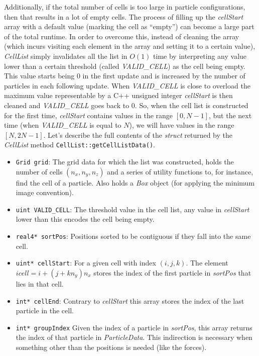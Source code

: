 \documentclass[twoside,openright,titlepage,numbers=noenddot,%
headinclude,footinclude,cleardoublepage=empty,abstract=on,
BCOR=5mm,fontsize=11pt, dvipsnames, paper=b5
]{scrreprt}
\def\ucpp{uammd_cpp_lexer.py:UAMMDCppLexer -x}
\begin{document}
Additionally, if the total number of cells is too large in particle configurations, then that results in a lot of empty cells. The process of filling up the \emph{cellStart} array with a default value (marking the cell as ``empty'') can become a large part of the total runtime. In order to overcome this, instead of cleaning the array (which incurs visiting each element in the array and setting it to a certain value), \emph{CellList} simply invalidates all the list in $O(1)$ time by interpreting any value lower than a certain threshold (called \emph{VALID\_CELL}) as the cell being empty.
This value starts being $0$ in the first update and is increased by the number of particles in each following update. When \emph{VALID\_CELL} is close to overload the maximum value representable by a C++ unsigned integer \emph{cellStart} is then cleaned and \emph{VALID\_CELL} goes back to $0$. So, when the cell list is constructed for the first time, \emph{cellStart} contains values in the range $[0, N-1]$, but the next time (when \emph{VALID\_CELL} is equal to $N$), we will have values in the range $[N, 2N-1]$.
Let's describe the full contents of the \emph{struct} returned by the \emph{CellList} method \texttt{CellList::getCellListData()}.
\begin{itemize}
\item\texttt{Grid grid}:
  The grid data for which the list was constructed, holds the number of cells $(n_x, n_y, n_z)$ and a series of utility functions to, for instance, find the cell of a particle. Also holds a \emph{Box} object (for applying the minimum image convention).
\item\texttt{uint VALID_CELL}:
  The threshold value in the cell list, any value in \emph{cellStart} lower than this encodes the cell being empty. 
\item\texttt{real4* sortPos}:
  Positions sorted to be contiguous if they fall into the same cell. 
\item\texttt{uint* cellStart}:
  For a given cell with index $(i,j,k)$. The element $icell = i + (j + kn_y)n_x$ stores the index of the first particle in \emph{sortPos} that lies in that cell.
\item\texttt{int* cellEnd}:
  Contrary to \emph{cellStart} this array stores the index of the last particle in the cell.
\item\texttt{int* groupIndex}
  Given the index of a particle in \emph{sortPos}, this array returns the index of that particle in \emph{ParticleData}.
  This indirection is necessary when something other than the positions is needed (like the forces).
\end{itemize}
\end{document}
